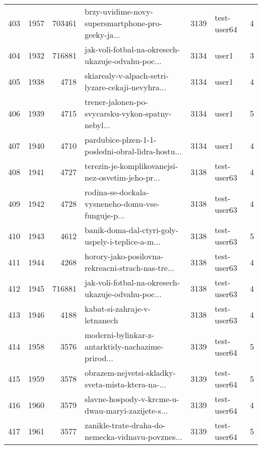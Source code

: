 \begin{tabular}{lrrlrlr}
403  &       1957 &   703461 &  brzy-uvidime-novy-supersmartphone-pro-geeky-ja... &     3139 &                  test-user64 &               4 \\
404  &       1932 &   716881 &  jak-voli-fotbal-na-okresech-ukazuje-odvahu-poc... &     3134 &                        user1 &               3 \\
405  &       1938 &     4718 &  skiarealy-v-alpach-setri-lyzare-cekaji-nevyhra... &     3134 &                        user1 &               4 \\
406  &       1939 &     4715 &  trener-jalonen-po-svycarsku-vykon-spatny-nebyl... &     3134 &                        user1 &               5 \\
407  &       1940 &     4710 &  pardubice-plzen-1-1-posledni-obral-lidra-hostu... &     3134 &                        user1 &               4 \\
408  &       1941 &     4727 &  terezin-je-komplikovanejsi-nez-osvetim-jeho-pr... &     3138 &                  test-user63 &               4 \\
409  &       1942 &     4728 &  rodina-se-dockala-vysneneho-domu-vse-funguje-p... &     3138 &                  test-user63 &               4 \\
410  &       1943 &     4612 &  banik-doma-dal-ctyri-goly-uspely-i-teplice-a-m... &     3138 &                  test-user63 &               5 \\
411  &       1944 &     4268 &  horory-jako-posilovna-rekreacni-strach-nas-tre... &     3138 &                  test-user63 &               4 \\
412  &       1945 &   716881 &  jak-voli-fotbal-na-okresech-ukazuje-odvahu-poc... &     3138 &                  test-user63 &               4 \\
413  &       1946 &     4188 &                       kabat-si-zahraje-v-letnanech &     3138 &                  test-user63 &               4 \\
414  &       1958 &     3576 &  moderni-bylinkar-z-antarktidy-nachazime-prirod... &     3139 &                  test-user64 &               5 \\
415  &       1959 &     3578 &  obrazem-nejvetsi-skladky-sveta-mista-ktera-na-... &     3139 &                  test-user64 &               5 \\
416  &       1960 &     3579 &  slavne-hospody-v-krcme-u-dwau-maryi-zazijete-s... &     3139 &                  test-user64 &               4 \\
417  &       1961 &     3577 &  zanikle-trate-draha-do-nemecka-vidnavu-povznes... &     3139 &                  test-user64 &               5 \\

\end{tabular}
